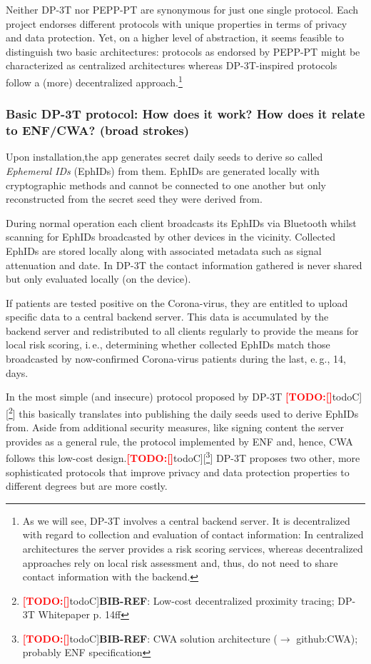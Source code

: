 \documentclass{llncs}
\newcommand{\TODO}[1]{\textcolor{red}{\textbf{[TODO:#1]}}}
\newcommand*{\TODOfn}[2][noteC]{\TODO[#1]{[\footnote{\TODO[#1]{#2}}]}}
\newcommand*{\TODOref}[2][todoC]{\TODOfn[#1]{\textbf{BIB-REF}: #2}}
\begin{document}
Neither DP-3T nor PEPP-PT are synonymous for just one single protocol. Each project endorses
different protocols with unique properties in terms of privacy and data protection.
Yet, on a higher level of abstraction, it seems feasible to distinguish two basic architectures:
protocols as endorsed by PEPP-PT might be characterized as centralized architectures whereas
DP-3T-inspired protocols follow a (more) decentralized approach.\footnote{%
  As we will see, DP-3T involves a central backend server. It is decentralized with regard to
  collection and evaluation of contact information:
  In centralized architectures the server provides a risk scoring services, whereas decentralized
  approaches rely on local risk assessment and, thus, do not need to share contact information with
  the backend.}

\subsubsection{Basic DP-3T protocol: How does it work? How does it relate to ENF/CWA? (broad strokes)}
%
Upon installation,the app generates secret daily seeds to derive so called \textit{Ephemeral IDs}
(EphIDs) from them. EphIDs are generated locally with cryptographic methods and cannot be connected
to one another but only reconstructed from the secret seed they were derived from.

During normal operation each client broadcasts its EphIDs via Bluetooth whilst scanning for
EphIDs broadcasted by other devices in the vicinity. Collected EphIDs are stored locally along
with associated metadata such as signal attenuation and date. In DP-3T the contact information
gathered is never shared but only evaluated locally (on the device).

If patients are tested positive on the Corona-virus, they are entitled to upload specific data to a
central backend server. This data is accumulated by the backend server and redistributed to all
clients regularly to provide the means for local risk scoring, i.\,e., determining whether collected
EphIDs match those broadcasted by now-confirmed Corona-virus patients during the last, e.\,g., 14, 
days.

In the most simple (and insecure) protocol proposed by DP-3T
\TODOref{Low-cost decentralized proximity tracing; DP-3T Whitepaper p. 14ff}
this basically translates into publishing the daily seeds used to derive EphIDs from.
Aside from additional security measures,
like signing content the server provides as a general rule, the protocol implemented by ENF and,
hence, CWA follows this low-cost design.\TODOref{CWA solution architecture ($\rightarrow$ github:CWA); probably ENF specification} DP-3T proposes two other, more sophisticated protocols that improve
privacy and data protection properties to different degrees but are more costly.
\end{document}
